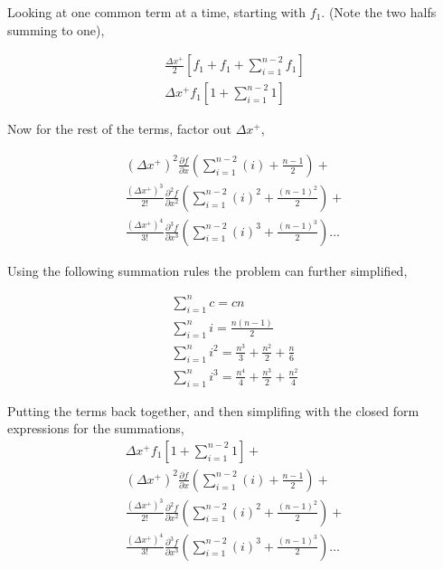 \documentclass[12pt]{article}
\begin{document}
Looking at one common term at a time, starting with $f_1$. (Note the two halfs
summing to one),

\begin{align*} \frac{\Delta x^+}{2}\left[ f_1 + f_1 + \sum_{i=1}^{n-2} f_1 \right] \\
    \Delta x^+ f_1\left[ 1 + \sum_{i=1}^{n-2}1 \right]
\end{align*}

Now for the rest of the terms, factor out $\Delta x^+$,

\begin{align*}
    (\Delta x^+)^2 \frac{\partial f}{\partial x } \left(
        \sum_{i = 1}^{n - 2} \left( i\right) + \frac{n-1}{2} \right) + \\
        \frac{(\Delta x^+)^3}{2!} \frac{\partial^2 f}{\partial x^2 } \left(
    \sum_{i = 1}^{n - 2} \left( i\right)^2 + \frac{(n-1)^2}{2} \right)  + \\
    \frac{(\Delta x^+)^4}{3!} \frac{\partial^3 f}{\partial x^3 } \left(
    \sum_{i = 1}^{n - 2} \left( i\right)^3 + \frac{(n-1)^3}{2} \right) \dots
\end{align*}

Using the following summation rules the problem can further simplified,

\begin{align*}
    \sum_{i = 1}^{n}c= cn  \\
    \sum_{i = 1}^{n}i =  \frac{n\left( n-1\right)}{2}  \\
    \sum_{i = 1}^{n}i^2  = \frac{n^3}{3} + \frac{n^2}{2} + \frac{n}{6}   \\
    \sum_{i = 1}^{n}i^3  = \frac{n^4}{4} + \frac{n^3}{2} + \frac{n^2}{4}  
\end{align*}

Putting the terms back together, and then simplifing with the closed form 
expressions for the summations,
\begin{align*}
    \Delta x^+ f_1\left[ 1 + \sum_{i=1}^{n-2}1 \right] + \\
    (\Delta x^+)^2 \frac{\partial f}{\partial x } \left(
        \sum_{i = 1}^{n - 2} \left( i\right) + \frac{n-1}{2} \right) + \\
        \frac{(\Delta x^+)^3}{2!} \frac{\partial^2 f}{\partial x^2 } \left(
    \sum_{i = 1}^{n - 2} \left( i\right)^2 + \frac{(n-1)^2}{2} \right)  + \\
    \frac{(\Delta x^+)^4}{3!} \frac{\partial^3 f}{\partial x^3 } \left(
    \sum_{i = 1}^{n - 2} \left( i\right)^3 + \frac{(n-1)^3}{2} \right) \dots
\end{align*}
\end{document}
